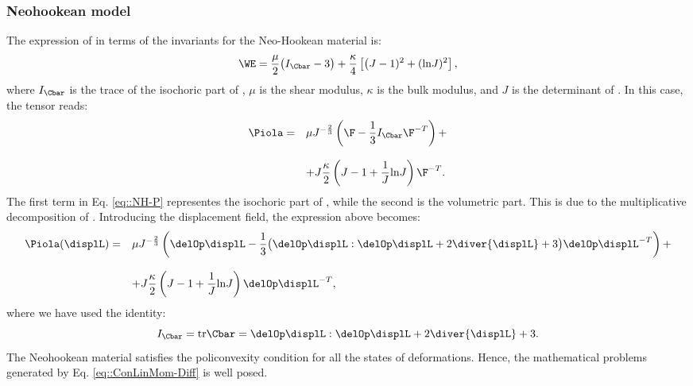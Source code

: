 \subsubsection{Neohookean model}
The expression of \W in terms of the invariants for the Neo-Hookean material is:
\begin{equation}
  \WE=\frac{\mu}{2}\big(I_{\Cbar}-3\big)+\frac{\kappa}{4}\left[\big(J-1)^2 + (\text{ln}J)^2\right],
\label{eq::strainNH}
\end{equation}
where $I_{\Cbar}$ is the trace of the isochoric part of \C, $\mu$ is the shear modulus, $\kappa$ is the bulk modulus, and $J$ is the determinant of \F. In this case, the tensor \Piola reads:
\begin{equation}
  \begin{array}{lll}
    \Piola = & \displaystyle \mu J^{-\frac{2}{3}}\left(\F-\frac{1}{3}I_{\Cbar}\F^{-T}\right) +\\
    \\
    & \displaystyle + J\frac{\kappa}{2}\left(J-1+\frac{1}{J}\text{ln}J\right)\F^{-T}.
  \end {array}
\label{eq::NH-P}
\end{equation}
The first term in Eq. \eqref{eq::NH-P} representes the isochoric part of \Piola, while the second is the volumetric part. This is due to the multiplicative decomposition of \F. Introducing the displacement field, the expression above becomes:
\begin{equation}
  \begin{array}{lll}
    \Piola(\displL) = & \displaystyle \mu J^{-\frac{2}{3}}\left(\delOp\displL - \frac{1}{3}\big(\delOp\displL:\delOp\displL+2\diver{\displL}+3\big)\delOp\displL^{-T}\right)+\\
    \\
    & \displaystyle + J\frac{\kappa}{2}\left(J-1+\frac{1}{J}\text{ln}J\right)\delOp\displL^{-T},
  \end{array}
\label{eq::NH-P-displ}
\end{equation}
where we have used the identity:
\begin{equation}
I_{\Cbar}=\text{tr}\Cbar=\delOp\displL:\delOp\displL + 2\diver{\displL}+3.
\label{eq::Id-trC-displ}
\end{equation}
The Neohookean material satisfies the policonvexity condition for all the states of deformations. Hence, the mathematical problems generated by Eq. \eqref{eq::ConLinMom-Diff} is well posed.

